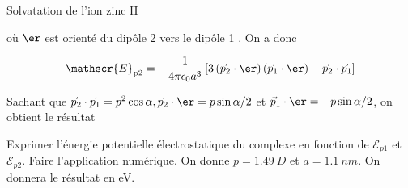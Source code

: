\begin{exo}[PC][3][TD]{Solvatation de l'ion zinc II}
\begin{quest}
{    où $\er$ est orienté du dipôle 2 vers le dipôle 1 . On a donc
    
    $$
    \mathscr{E}_{\mathrm{p} 2}=-\frac{1}{4 \pi \epsilon_0 a^3}\left[3\left(\Vec{p}_2 \cdot \er\right)\left(\Vec{p}_1 \cdot \er\right)-\Vec{p}_2 \cdot \Vec{p}_1\right]
    $$
    
    
    Sachant que $\Vec{p}_2 \cdot \Vec{p}_1=p^2 \cos \alpha, \Vec{p}_2 \cdot \er=p \sin \alpha / 2$ et $\Vec{p}_1 \cdot \er=-p \sin \alpha / 2$, on obtient le résultat
    
    
  }
\item Exprimer l'énergie potentielle électrostatique du complexe en fonction de $\mathscr{E}_{p 1}$ et $\mathscr{E}_{p 2}$. Faire l'application numérique. On donne $p=\SI{1,49}{D}$ et $a = \SI{1.1}{nm}$. On donnera le résultat en eV.

\end{quest}
\end{exo}

